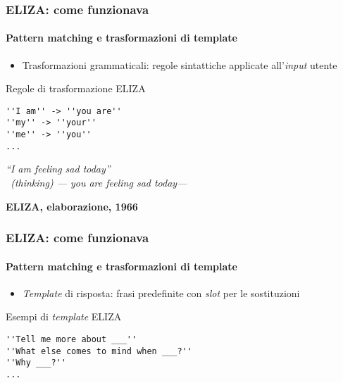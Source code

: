 %
\begin{frame}[t,fragile] \frametitle{ELIZA: come funzionava}
	{\small
		\framesubtitle{Pattern matching e trasformazioni di template}
		\begin{itemize}[leftmargin=10pt,align=right]
			\item[\alert{\faArrowCircleRight}] \alert{Trasformazioni grammaticali:} regole sintattiche applicate all'\textit{input} utente
		\end{itemize}
		\vspace*{.3cm}
		\hspace*{4cm}
		\begin{shellcodeblock}{Regole di trasformazione ELIZA}
        	\begin{verbatim}
''I am'' -> ''you are''
''my'' -> ''your''
''me'' -> ''you''
...
        	\end{verbatim}
    	\end{shellcodeblock}
		\hspace*{4cm}
		\begin{minipage}[t]{.6\textwidth}
			\renewcommand{\epigraphsize}{\scriptsize}
			\setlength{\afterepigraphskip}{0pt}
			\setlength{\beforeepigraphskip}{5pt}
			\setlength{\epigraphwidth}{0.9\textwidth}
			\epigraph{\textit{\alert{\faUser} ``\alert{I am} feeling sad today''\\
			\alert{\faTerminal\ (thinking)} --- \alert{you are} feeling sad today---}}{\textbf{ELIZA, elaborazione, 1966}}
		\end{minipage}
	}
\end{frame}
%
\begin{frame}[t,fragile] \frametitle{ELIZA: come funzionava}
	{\small
		\framesubtitle{Pattern matching e trasformazioni di template}
		\begin{itemize}[leftmargin=10pt,align=right]
			\item[\alert{\faArrowCircleRight}] \alert{\textit{Template} di risposta:} frasi predefinite con \textit{slot} per le sostituzioni
		\end{itemize}
		\vspace*{.3cm}
		\hspace*{4cm}
		\begin{shellcodeblock}{Esempi di \textit{template} ELIZA}
        	\begin{verbatim}
''Tell me more about ___''
''What else comes to mind when ___?''
''Why ___?''
...
        	\end{verbatim}
    	\end{shellcodeblock}
	}
\end{frame}
